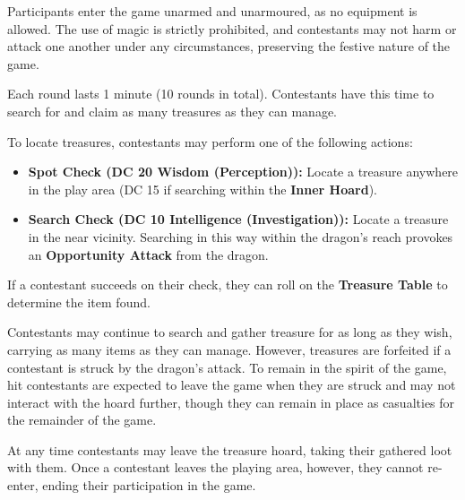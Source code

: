 {\entryfont\noindent Participants enter the game unarmed and unarmoured, as no equipment is allowed. The use of magic is strictly prohibited, and contestants may not harm or attack one another under any circumstances, preserving the festive nature of the game.

Each round lasts 1 minute (10 rounds in total). Contestants have this time to search for and claim as many treasures as they can manage.

To locate treasures, contestants may perform one of the following actions:
\begin{itemize}
	\renewcommand\labelitemi{\textbf{\textbullet}}
	\item \textbf{Spot Check (DC 20 Wisdom (Perception)):} Locate a treasure anywhere in the play area (DC 15 if searching within the \textbf{Inner Hoard}).
	\item \textbf{Search Check (DC 10 Intelligence (Investigation)):} Locate a treasure in the near vicinity. Searching in this way within the dragon's reach provokes an \textbf{Opportunity Attack} from the dragon.
\end{itemize}
If a contestant succeeds on their check, they can roll on the \textbf{Treasure Table} to determine the item found.

Contestants may continue to search and gather treasure for as long as they wish, carrying as many items as they can manage. However, treasures are forfeited if a contestant is struck by the dragon's attack. To remain in the spirit of the game, hit contestants are expected to leave the game when they are struck and may not interact with the hoard further, though they can remain in place as casualties for the remainder of the game.

At any time contestants may leave the treasure hoard, taking their gathered loot with them. Once a contestant leaves the playing area, however, they cannot re-enter, ending their participation in the game.}

